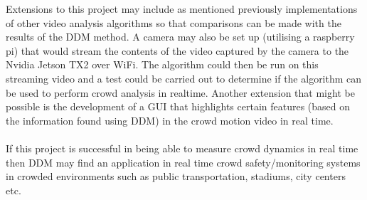 \documentclass[11pt]{article}
\begin{document}
Extensions to this project may include as mentioned previously implementations of other video analysis algorithms so that comparisons can be made with the results of the DDM method.
A camera may also be set up (utilising a raspberry pi) that would stream the contents of the video captured by the camera to the Nvidia Jetson TX2 over WiFi.
The algorithm could then be run on this streaming video and a test could be carried out to determine if the algorithm can be used to perform crowd analysis in realtime.
Another extension that might be possible is the development of a GUI that highlights certain features (based on the information found using DDM) in the crowd motion video in real time.
\\\\
If this project is successful in being able to measure crowd dynamics in real time then DDM may find an application in real time crowd safety/monitoring systems in crowded environments such as public transportation, stadiums, city centers etc.

\end{document}
